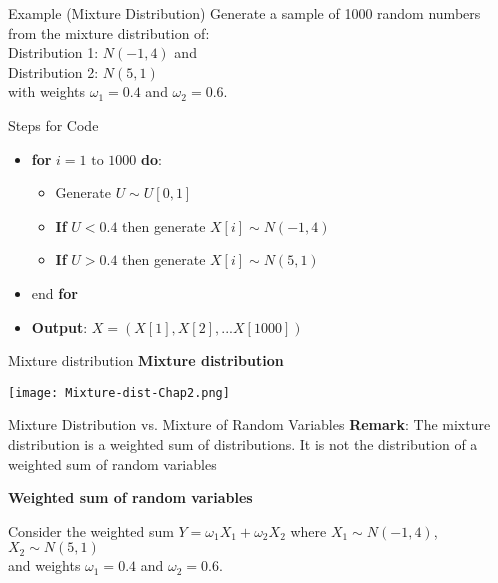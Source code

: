 \documentclass[8pt]{beamer}
\begin{document}
\begin{frame}{Example (Mixture Distribution)}
Generate a sample of 1000 random numbers from the mixture distribution of:\\
Distribution 1: $N(-1,4)$  and \\
Distribution 2: $N(5,1)$  \\
with weights $\omega_1=0.4$ and $\omega_2=0.6$. \\

\vspace{2mm}

\alert{Steps for Code}
\begin{itemize}
	\item \textbf{for} $i=1 \text{ to } 1000$ \textbf{do}:
		\begin{itemize}
			\item Generate $U \sim U[0,1]$
			\item \textbf{If} $U<0.4$ then generate $X[i] \sim N(-1,4)$
			\item \textbf{If} $U>0.4$ then generate $X[i] \sim N(5,1)$
		\end{itemize}
	\item end \textbf{for}
	\item \textbf{Output}: $X=(X[1],X[2],...X[1000])$
\end{itemize}
\end{frame}

\begin{frame}{Mixture distribution}
\textbf{Mixture distribution}
\begin{center}
\texttt{[image: Mixture-dist-Chap2.png]}
\end{center}
\end{frame}


\begin{frame}[fragile]{Mixture Distribution vs. Mixture of Random Variables}
\textbf{Remark}: The mixture distribution is a weighted sum of distributions. \alert{It is not the distribution of a weighted sum of random variables}

\vspace{3mm}

{\bf Weighted sum of random variables}

Consider the weighted sum $Y=\omega_1 X_1+\omega_2 X_2$ where
$X_1 \sim N(-1,4)$, \\
$X_2 \sim N(5,1)$  \\
and weights $\omega_1=0.4$ and $\omega_2=0.6$.
\end{frame}
\end{document}
